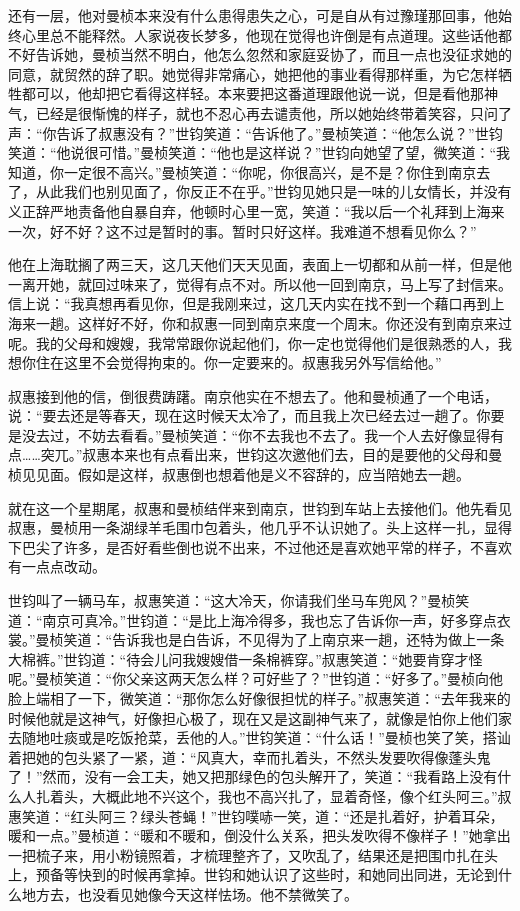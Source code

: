 \par 还有一层，他对曼桢本来没有什么患得患失之心，可是自从有过豫瑾那回事，他始终心里总不能释然。人家说夜长梦多，他现在觉得也许倒是有点道理。这些话他都不好告诉她，曼桢当然不明白，他怎么忽然和家庭妥协了，而且一点也没征求她的同意，就贸然的辞了职。她觉得非常痛心，她把他的事业看得那样重，为它怎样牺牲都可以，他却把它看得这样轻。本来要把这番道理跟他说一说，但是看他那神气，已经是很惭愧的样子，就也不忍心再去谴责他，所以她始终带着笑容，只问了声：“你告诉了叔惠没有？”世钧笑道：“告诉他了。”曼桢笑道：“他怎么说？”世钧笑道：“他说很可惜。”曼桢笑道：“他也是这样说？”世钧向她望了望，微笑道：“我知道，你一定很不高兴。”曼桢笑道：“你呢，你很高兴，是不是？你住到南京去了，从此我们也别见面了，你反正不在乎。”世钧见她只是一味的儿女情长，并没有义正辞严地责备他自暴自弃，他顿时心里一宽，笑道：“我以后一个礼拜到上海来一次，好不好？这不过是暂时的事。暂时只好这样。我难道不想看见你么？”
\par 他在上海耽搁了两三天，这几天他们天天见面，表面上一切都和从前一样，但是他一离开她，就回过味来了，觉得有点不对。所以他一回到南京，马上写了封信来。信上说：“我真想再看见你，但是我刚来过，这几天内实在找不到一个藉口再到上海来一趟。这样好不好，你和叔惠一同到南京来度一个周末。你还没有到南京来过呢。我的父母和嫂嫂，我常常跟你说起他们，你一定也觉得他们是很熟悉的人，我想你住在这里不会觉得拘束的。你一定要来的。叔惠我另外写信给他。”
\par 叔惠接到他的信，倒很费踌躇。南京他实在不想去了。他和曼桢通了一个电话，说：“要去还是等春天，现在这时候天太冷了，而且我上次已经去过一趟了。你要是没去过，不妨去看看。”曼桢笑道：“你不去我也不去了。我一个人去好像显得有点……突兀。”叔惠本来也有点看出来，世钧这次邀他们去，目的是要他的父母和曼桢见见面。假如是这样，叔惠倒也想着他是义不容辞的，应当陪她去一趟。
\par 就在这一个星期尾，叔惠和曼桢结伴来到南京，世钧到车站上去接他们。他先看见叔惠，曼桢用一条湖绿羊毛围巾包着头，他几乎不认识她了。头上这样一扎，显得下巴尖了许多，是否好看些倒也说不出来，不过他还是喜欢她平常的样子，不喜欢有一点点改动。
\par 世钧叫了一辆马车，叔惠笑道：“这大冷天，你请我们坐马车兜风？”曼桢笑道：“南京可真冷。”世钧道：“是比上海冷得多，我也忘了告诉你一声，好多穿点衣裳。”曼桢笑道：“告诉我也是白告诉，不见得为了上南京来一趟，还特为做上一条大棉裤。”世钧道：“待会儿问我嫂嫂借一条棉裤穿。”叔惠笑道：“她要肯穿才怪呢。”曼桢笑道：“你父亲这两天怎么样？可好些了？”世钧道：“好多了。”曼桢向他脸上端相了一下，微笑道：“那你怎么好像很担忧的样子。”叔惠笑道：“去年我来的时候他就是这神气，好像担心极了，现在又是这副神气来了，就像是怕你上他们家去随地吐痰或是吃饭抢菜，丢他的人。”世钧笑道：“什么话！”曼桢也笑了笑，搭讪着把她的包头紧了一紧，道：“风真大，幸而扎着头，不然头发要吹得像蓬头鬼了！”然而，没有一会工夫，她又把那绿色的包头解开了，笑道：“我看路上没有什么人扎着头，大概此地不兴这个，我也不高兴扎了，显着奇怪，像个红头阿三。”叔惠笑道：“红头阿三？绿头苍蝇！”世钧噗哧一笑，道：“还是扎着好，护着耳朵，暖和一点。”曼桢道：“暖和不暖和，倒没什么关系，把头发吹得不像样子！”她拿出一把梳子来，用小粉镜照着，才梳理整齐了，又吹乱了，结果还是把围巾扎在头上，预备等快到的时候再拿掉。世钧和她认识了这些时，和她同出同进，无论到什么地方去，也没看见她像今天这样怯场。他不禁微笑了。

